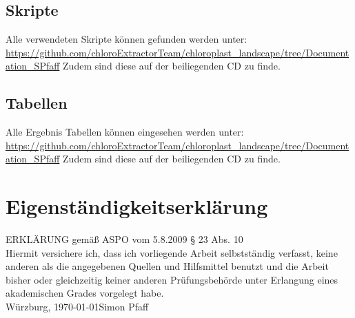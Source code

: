 \documentclass{scrartcl}
\begin{document}
\subsection{Skripte}
\label{sec-7-3}
Alle verwendeten Skripte können gefunden werden unter:
\\
\url{https://github.com/chloroExtractorTeam/chloroplast_landscape/tree/Documentation_SPfaff}
Zudem sind diese auf der beiliegenden CD zu finde.
\subsection{Tabellen}
\label{sec-7-4}
Alle Ergebnis Tabellen können eingesehen werden unter: 
\\
\url{https://github.com/chloroExtractorTeam/chloroplast_landscape/tree/Documentation_SPfaff}
Zudem sind diese auf der beiliegenden CD zu finde.
\clearpage
\section*{Eigenständigkeitserklärung}
ERKLÄRUNG gemäß ASPO vom 5.8.2009 § 23 Abs. 10\\[10mm]
Hiermit versichere ich, dass ich vorliegende Arbeit selbstständig verfasst, keine anderen als
die angegebenen Quellen und Hilfsmittel benutzt und die Arbeit bisher oder gleichzeitig
keiner anderen Prüfungsbehörde unter Erlangung eines akademischen Grades
vorgelegt habe.\\[20mm]
Würzburg, \today \hfill Simon Pfaff
\clearpage
\end{document}

